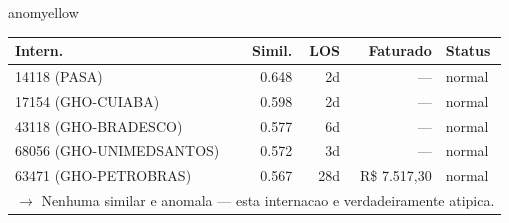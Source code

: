 \documentclass[a4paper,10pt]{article}
\begin{document}
\begin{anomalycard}[Internacao 9512 | GHO-REALGRANDEZA | MODERADO (z=2.26)]{anomyellow}
\begin{tabular}{l r r r l}\toprule\textbf{Intern.} & \textbf{Simil.} & \textbf{LOS} & \textbf{Faturado} & \textbf{Status} \\\midrule
14118 (PASA) & 0.648 & 2d & --- & \textcolor{jcubeblue}{normal} \\
17154 (GHO-CUIABA) & 0.598 & 2d & --- & \textcolor{jcubeblue}{normal} \\
43118 (GHO-BRADESCO) & 0.577 & 6d & --- & \textcolor{jcubeblue}{normal} \\
68056 (GHO-UNIMEDSANTOS) & 0.572 & 3d & --- & \textcolor{jcubeblue}{normal} \\
63471 (GHO-PETROBRAS) & 0.567 & 28d & R\$ 7.517,30 & \textcolor{jcubeblue}{normal} \\
\multicolumn{5}{l}{\textcolor{jcubeblue}{\small $\rightarrow$ Nenhuma similar e anomala --- esta internacao e verdadeiramente atipica.}} \\
\bottomrule\end{tabular}



\end{anomalycard}
\end{document}
